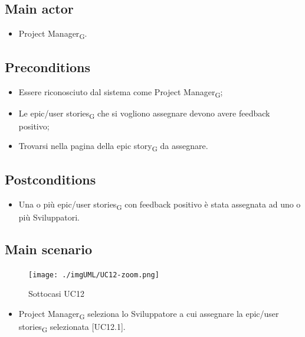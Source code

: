 \documentclass{article}
\begin{document}
    \subsection*{Main actor}
    \begin{itemize}
        \item Project Manager\textsubscript{G}.
    \end{itemize}
    
    \subsection*{Preconditions}
        \begin{itemize}
            \item Essere riconosciuto dal sistema come Project Manager\textsubscript{G};
            \item Le epic/user stories\textsubscript{G} che si vogliono assegnare devono avere feedback positivo;
            \item Trovarsi nella pagina della epic story\textsubscript{G} da assegnare.
        \end{itemize}
        
    \subsection*{Postconditions}
        \begin{itemize}
            \item Una o più epic/user stories\textsubscript{G} con feedback positivo è stata assegnata ad uno o più Sviluppatori.
        \end{itemize}
    
    \subsection*{Main scenario}
        \begin{figure}[h]
          \centering
          \texttt{[image: ./imgUML/UC12-zoom.png]}
          \caption{Sottocasi UC12}
          \label{fig:UC12_sottocasi}
        \end{figure}
        
        \begin{itemize}
            \item Project Manager\textsubscript{G} seleziona lo Sviluppatore a cui assegnare la epic/user stories\textsubscript{G} selezionata [UC12.1].
        \end{itemize}
        
\end{document}
